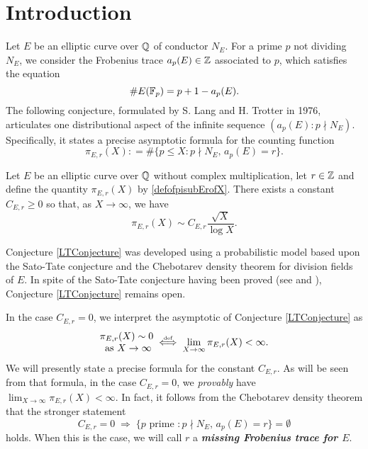 \section{Introduction}
\label{intro\colonbasics}

Let $E$ be an elliptic curve over $\mathbb{Q}$ of conductor $N_E$.  For a prime $p$ not dividing $N_E$, we consider the Frobenius trace $a_p(E) \in \mathbb{Z}$ associated to $p$, which satisfies the equation
\[
\#E(\mathbb{F}_p) = p + 1 - a_p(E).
\]
The following conjecture, formulated by S. Lang and H. Trotter in 1976, articulates one distributional aspect of the infinite sequence $\left( a_p(E) \colon p \nmid N_E \right)$.  Specifically, it states a precise asymptotic formula for the counting function
\begin{equation} \label{defofpisubErofX}
\pi_{E,r}(X) \colon= \# \{ p \leq X \colon p \nmid N_E, \, a_p(E) = r \}.
\end{equation}
\begin{Conjecture} \label{LTConjecture}
Let $E$ be an elliptic curve over $\mathbb{Q}$ without complex multiplication, let $r \in \mathbb{Z}$ and define the quantity $\pi_{E,r}(X)$ by \eqref{defofpisubErofX}.  There exists a constant $C_{E,r} \geq 0$ so that, as $X \rightarrow \infty$, we have
\[
\pi_{E,r}(X) \sim C_{E,r} \frac{\sqrt{X}}{\log X}.
\]
\end{Conjecture}
\begin{remark}
Conjecture \ref{LTConjecture} was developed using a probabilistic model based upon the Sato-Tate conjecture and the Chebotarev density theorem for division fields of $E$.  In spite of the Sato-Tate conjecture having been proved (see \cite{clozeletal} and \cite{taylor}), Conjecture \ref{LTConjecture} remains open.
\end{remark}
In the case $C_{E,r} = 0$, we interpret the asymptotic of Conjecture \ref{LTConjecture} as
\begin{equation} \label{CErequalszerocase}
\begin{matrix} \pi_{E,r}(X) \sim 0 \\ \text{ as } X\rightarrow \infty \end{matrix} \; \myeq \; \lim_{X \rightarrow \infty} \pi_{E,r}(X) < \infty.
\end{equation}
We will presently state a precise formula for the constant $C_{E,r}$.  As will be seen from that formula, in the case $C_{E,r} = 0$, we \emph{provably} have  $\displaystyle \lim_{X \rightarrow \infty} \pi_{E,r}(X) < \infty$.  In fact, it follows from the Chebotarev density theorem that the stronger statement
\[
C_{E,r} = 0 \; \Longrightarrow \; \{ p \text{ prime } \colon p \nmid N_E, \, a_p(E) = r \} = \emptyset
\]
holds.  When this is the case, we will call $r$ a \textbf{\emph{missing Frobenius trace for $E$}}.

